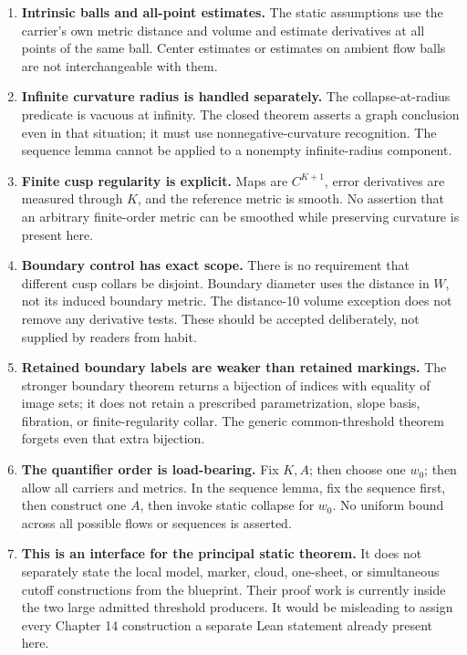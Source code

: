 \documentclass[
  letterpaper,
  11pt]{article}
\providecommand{\tightlist}{%
  \setlength{\itemsep}{0pt}\setlength{\parskip}{0pt}}
\begin{document}
\begin{enumerate}
\def\labelenumi{\arabic{enumi}.}
\tightlist
\item
  \textbf{Intrinsic balls and all-point estimates.} The static
  assumptions use the carrier's own metric distance and volume and
  estimate derivatives at all points of the same ball. Center estimates
  or estimates on ambient flow balls are not interchangeable with them.
\item
  \textbf{Infinite curvature radius is handled separately.} The
  collapse-at-radius predicate is vacuous at infinity. The closed
  theorem asserts a graph conclusion even in that situation; it must use
  nonnegative-curvature recognition. The sequence lemma cannot be
  applied to a nonempty infinite-radius component.
\item
  \textbf{Finite cusp regularity is explicit.} Maps are \(C^{K+1}\),
  error derivatives are measured through \(K\), and the reference metric
  is smooth. No assertion that an arbitrary finite-order metric can be
  smoothed while preserving curvature is present here.
\item
  \textbf{Boundary control has exact scope.} There is no requirement
  that different cusp collars be disjoint. Boundary diameter uses the
  distance in \(W\), not its induced boundary metric. The distance-10
  volume exception does not remove any derivative tests. These should be
  accepted deliberately, not supplied by readers from habit.
\item
  \textbf{Retained boundary labels are weaker than retained markings.}
  The stronger boundary theorem returns a bijection of indices with
  equality of image sets; it does not retain a prescribed
  parametrization, slope basis, fibration, or finite-regularity collar.
  The generic common-threshold theorem forgets even that extra
  bijection.
\item
  \textbf{The quantifier order is load-bearing.} Fix \(K,A\); then
  choose one \(w_0\); then allow all carriers and metrics. In the
  sequence lemma, fix the sequence first, then construct one \(A\), then
  invoke static collapse for \(w_0\). No uniform bound across all
  possible flows or sequences is asserted.
\item
  \textbf{This is an interface for the principal static theorem.} It
  does not separately state the local model, marker, cloud, one-sheet,
  or simultaneous cutoff constructions from the blueprint. Their proof
  work is currently inside the two large admitted threshold producers.
  It would be misleading to assign every Chapter 14 construction a
  separate Lean statement already present here.
\end{enumerate}
\end{document}
